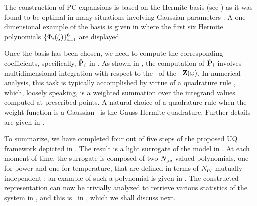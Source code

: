 The construction of PC expansions is based on the Hermite basis (see ) as it was found to be optimal in many situations involving Gaussian parameters \cite{xiu2002}. A one-dimensional example of the basis is given in  where the first six Hermite polynomials $\{ \Phi_i(\zeta) \}_{i = 1}^6$ are displayed.

Once the basis has been chosen, we need to compute the corresponding coefficients, specifically, $\hat{\mathbf{P}}_i$ in . As shown in , the computation of $\hat{\mathbf{P}}_i$ involves multidimensional integration with respect to the \pdf\ of the \rvs\ $\mathbf{Z}(\omega)$. In numerical analysis, this task is typically accomplished by virtue of a quadrature rule \cite{press2007}, which, loosely speaking, is a weighted summation over the integrand values computed at prescribed points. A natural choice of a quadrature rule when the weight function is a Gaussian \pdf\ is the Gauss-Hermite quadrature. Further details are given in .

To summarize, we have completed four out of five steps of the proposed UQ framework depicted in . The result is a light surrogate of the model in . At each moment of time, the surrogate is composed of two ${N_\text{pe}}$-valued polynomials, one for power and one for temperature, that are defined in terms of ${N_\text{rv}}$ mutually independent \rvs; an example of such a polynomial is given in . The constructed representation can now be trivially analyzed to retrieve various statistics of the system in , and this is \ in , which we shall discuss next.
